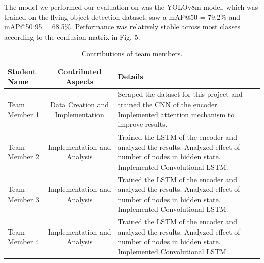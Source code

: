 \documentclass[10pt,twocolumn,letterpaper]{article}
\begin{document}

The model we performed our evaluation on was the YOLOv8m model, which was trained on the flying object detection dataset, saw a mAP@50 = 79.2\% and mAP@50:95 = 68.5\%. Performance was relatively stable across most classes according to the confusion matrix in Fig. 5. 

\newpage
{\small


}

\begin{table}
\begin{center}
\begin{tabular}{|l|c|p{8cm}|}
\hline
Student Name & Contributed Aspects & Details \\
\hline\hline
Team Member 1 & Data Creation and Implementation & Scraped the dataset for this project and trained the CNN of the encoder. Implemented attention mechanism to improve results. \\
Team Member 2 & Implementation and Analysis & Trained the LSTM of the encoder and analyzed the results. Analyzed effect of number of nodes in hidden state.  Implemented Convolutional LSTM. \\
Team Member 3 & Implementation and Analysis & Trained the LSTM of the encoder and analyzed the results. Analyzed effect of number of nodes in hidden state.  Implemented Convolutional LSTM. \\
Team Member 4 & Implementation and Analysis & Trained the LSTM of the encoder and analyzed the results. Analyzed effect of number of nodes in hidden state.  Implemented Convolutional LSTM. \\
\hline
\end{tabular}
\end{center}
\caption{Contributions of team members.}
\label{tab:contributions}
\end{table}
\end{document}

